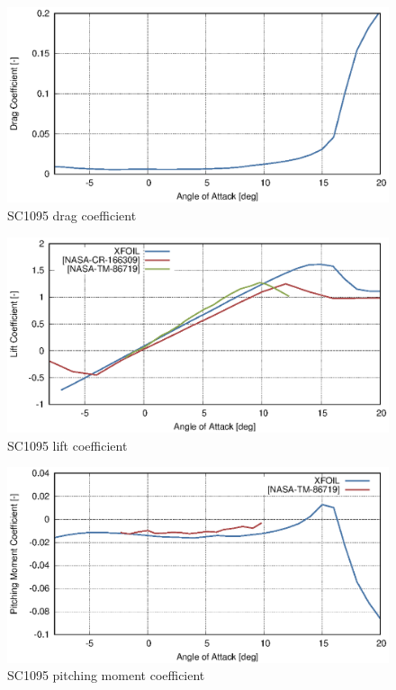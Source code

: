 \restoregeometry

\begin{figure}[p]
  \centering
  \includegraphics[width=140mm]{eps/uh60_blade_sc1095_cx.eps}
  \caption{SC1095 drag coefficient}
\end{figure}

\begin{figure}[p]
  \centering
  \includegraphics[width=140mm]{eps/uh60_blade_sc1095_cz.eps}
  \caption{SC1095 lift coefficient}
\end{figure}

\begin{figure}[p]
  \centering
  \includegraphics[width=140mm]{eps/uh60_blade_sc1095_cm.eps}
  \caption{SC1095 pitching moment coefficient}
\end{figure}
